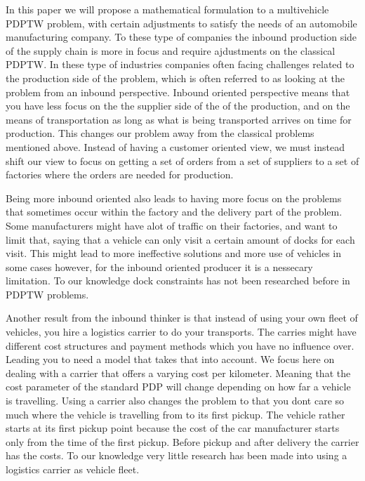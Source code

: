\documentclass[a4paper,10pt]{article}
\begin{document}
In this paper we will propose a mathematical formulation to a multivehicle PDPTW problem, with certain adjustments to satisfy the needs of an automobile manufacturing company.
To these type of companies the inbound production side of the supply chain is more in focus and require ajdustments on the classical PDPTW.
In these type of industries companies often facing challenges related to the production side of the problem, which is often referred to as looking at the problem from an inbound perspective.
Inbound oriented perspective means that you have less focus on the the supplier side of the of the production, and on the means of transportation as long as what is being transported arrives on time for production.
This changes our problem away from the classical problems mentioned above. 
Instead of having a customer oriented view, we must instead shift our view to focus on getting a set of orders from a set of suppliers to a set of factories where the orders are needed for production. 
\par
Being more inbound oriented also leads to having more focus on the problems that sometimes occur within the factory and the delivery part of the problem.
Some manufacturers might have alot of traffic on their factories, and want to limit that, saying that a vehicle can only visit a certain amount of docks for each visit.
This might lead to more ineffective solutions and more use of vehicles in some cases however, for the inbound oriented producer it is a nessecary limitation. To our knowledge dock constraints has not been researched before in PDPTW problems. \par

Another result from the inbound thinker is that instead of using your own fleet of vehicles, you hire a logistics carrier to do your transports.
The carries might have different cost structures and payment methods which you have no influence over.
Leading you to need a model that takes that into account.
We focus here on dealing with a carrier that offers a varying cost per kilometer.
Meaning that the cost parameter of the standard PDP will change depending on how far a vehicle is travelling. 
Using a carrier also changes the problem to that you dont care so much where the vehicle is travelling from to its first pickup.   
The vehicle rather starts at its first pickup point because the cost of the car manufacturer starts only from the time of the first pickup.
Before pickup and after delivery the carrier has the costs. To our knowledge very little research has been made into using a logistics carrier as vehicle fleet. \par
\end{document}
